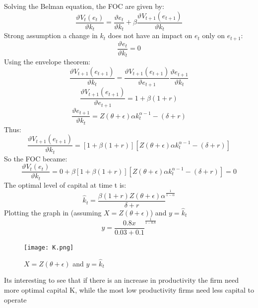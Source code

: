 \documentclass[12pt]{article}
\begin{document}
Solving the Belman equation, the FOC are given by:
\[\frac{\vartheta V_t(e_t)}{\vartheta k_t } =\frac{\vartheta e_t}{\vartheta k_t } +
 \beta \frac{\vartheta V_{t+1}(e_{t+1})}{\vartheta k_t } \]
Strong assumption a change in \(k_t\) does not have an impact on \(e_t\) only on \(e_{t+1}\):
\[\frac{\vartheta e_t}{\vartheta k_t} = 0\]
Using the envelope theorem:
\[\frac{\vartheta
V_{t+1}(e_{t+1})}{\vartheta k_t } = \frac{\vartheta
V_{t+1}(e_{t+1})}{\vartheta e_{t+1} }\frac{\vartheta e_{t+1}}{\vartheta k_t}\]
\[\frac{\vartheta V_{t+1}(e_{t+1})}{\vartheta e_{t+1} } =1 + \beta(1+r)\]
\[\frac{\vartheta e_{t+1}}{\vartheta k_t} = Z(\theta +\epsilon)\alpha k_t^{\alpha-1}
-(\delta + r)\]
Thus:
\[\frac{\vartheta V_{t+1}(e_{t+1})}{\vartheta k_t } = 
[1+\beta(1+r)] [Z(\theta + \epsilon)\alpha k_t^{\alpha-1}-(\delta + r)] \]
So the FOC became:
\[\frac{\vartheta V_t(e_t)}{\vartheta k_t } = 0 + \beta [1+\beta(1+r)] [Z(\theta + \epsilon)\alpha
k_t^{\alpha-1}-(\delta + r)]  = 0 \]
The optimal level of capital at time t is:
\[\widehat{k} _t= {\frac{\beta(1+r) Z(\theta +\epsilon)\alpha}{\delta + r}}^{\frac{1}{1-\alpha}} \]
Plotting the graph in (assuming \(X=Z(\theta +\epsilon)\)) and \(y=\widehat{k} _t\)
\[ y={\frac{0.8 x}{0.03+0.1}}^{\frac{1}{1-0.8}}\]

\begin{figure}
    \centering
    \texttt{[image: K.png]}
    \caption{\(X=Z(\theta +\epsilon)\) and \(y=\widehat{k} _t\) }
    \label{plot:k_static}
\end{figure}
Its interesting to see that if there is an increase in productivity the firm need more optimal capital K, while the most
low productivity firms need less capital to operate 
\end{document}
